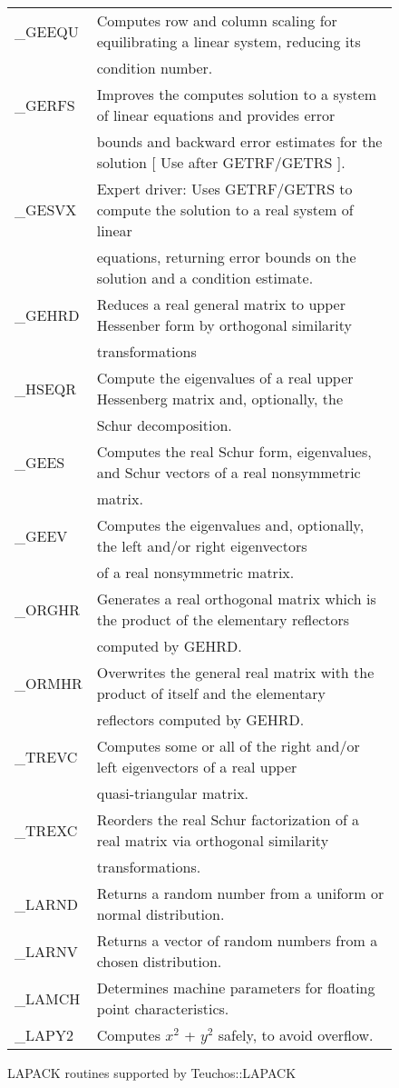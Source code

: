 \begin{figure}[hbt]
{{\begin{tabular}{|l||l|}
\_GEEQU & Computes row and column scaling for equilibrating a linear system, reducing its \\
 & condition number. \\\hline
\_GERFS & Improves the computes solution to a system of linear equations and provides error \\
 & bounds and backward error estimates for the solution [ Use after GETRF/GETRS ].\\\hline
\_GESVX & Expert driver:  Uses GETRF/GETRS to compute the solution to a real system of linear \\
 & equations, returning error bounds on the solution and a condition estimate. \\\hline
\_GEHRD & Reduces a real general matrix to upper Hessenber form by orthogonal similarity \\
 & transformations \\\hline
\_HSEQR & Compute the eigenvalues of a real upper Hessenberg matrix and, optionally, the \\
 & Schur decomposition. \\\hline
\_GEES & Computes the real Schur form, eigenvalues, and Schur vectors of a real nonsymmetric \\
 & matrix. \\\hline
\_GEEV & Computes the eigenvalues and, optionally, the left and/or right eigenvectors \\
 & of a real nonsymmetric matrix. \\\hline
\_ORGHR & Generates a real orthogonal matrix which is the product of the elementary reflectors \\
 & computed by GEHRD. \\\hline
\_ORMHR & Overwrites the general real matrix with the product of itself and the elementary \\
 & reflectors computed by GEHRD. \\\hline
\_TREVC & Computes some or all of the right and/or left eigenvectors of a real upper \\
 & quasi-triangular matrix. \\\hline
\_TREXC & Reorders the real Schur factorization of a real matrix via orthogonal similarity \\
 & transformations. \\\hline
\_LARND & Returns a random number from a uniform or normal distribution. \\\hline
\_LARNV & Returns a vector of random numbers from a chosen distribution. \\\hline
\_LAMCH & Determines machine parameters for floating point characteristics. \\\hline
\_LAPY2 & Computes $x^2$ + $y^2$ safely, to avoid overflow. \\\hline
\end{tabular}}}
\caption{LAPACK routines supported by Teuchos::LAPACK}\label{lapack_routines}
\end{figure}

